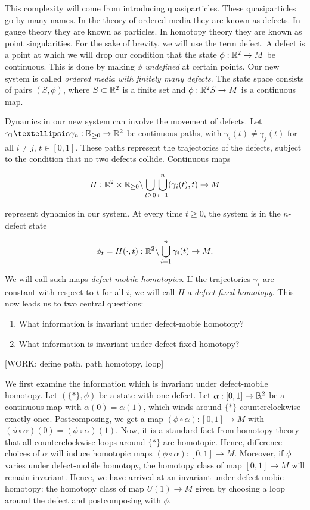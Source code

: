 \documentclass{article}
\theoremstyle{definition}
\numberwithin{figure}{section}
\begin{document}
This complexity will come from introducing quasiparticles. These quasiparticles go by many names. In the theory of ordered media they are known as defects. In gauge theory they are known as particles. In homotopy theory they are known as point singularities. For the sake of brevity, we will use the term defect. A defect is a point at which we will drop our condition that the state $\phi:\mathbb{R}^2\to M$ be continuous. This is done by making $\phi$ \textit{undefined} at certain points. Our new system is called \textit{ordered media with finitely many defects}. The state space consists of pairs $(S,\phi)$, where $S\subset \mathbb{R}^2$ is a finite set and $\phi: \mathbb{R}^2\\ S\to M$ is a continuous map.

Dynamics in our new system can involve the movement of defects. Let $\gamma_1… \gamma_n: \RR_{\geq 0} \to \RR^2$ be continuous paths, with $ \gamma_i(t)\neq \gamma_j(t)$ for all $i\neq j$, $t\in [0,1]$. These paths represent the trajectories of the defects, subject to the condition that no two defects collide. Continuous maps

$$H:\mathbb{R}^2\times \mathbb{R}_{\geq 0} \backslash \bigcup_{t\geq 0}\bigcup_{i=1}^{n}(\gamma_i(t),t)\to M$$

represent dynamics in our system. At every time $t\geq 0$, the system is in the $n$-defect state

$$\phi_t=H(\cdot,t): \mathbb{R}^2\backslash \bigcup_{i=1}^{n}\gamma_i(t)\to M.$$

We will call such maps \textit{defect-mobile homotopies}. If the trajectories $\gamma_i$ are constant with respect to $t$ for all $i$, we will call $H$ a \textit{defect-fixed homotopy}. This now leads us to two central questions:

\begin{enumerate}
\item What information is invariant under defect-mobie homotopy?
\item What information is invariant under defect-fixed homotopy?
\end{enumerate}


[WORK: define path, path homotopy, loop]

We first examine the information which is invariant under defect-mobile homotopy. Let $(\{*\},\phi)$ be a state with one defect. Let $\alpha:[0,1]\to \mathbb{R}^2$ be a continuous map with $\alpha(0)=\alpha(1)$, which winds around $\{*\}$ counterclockwise exactly once. Postcomposing, we get a map $(\phi\circ \alpha): [0,1]\to M$ with $(\phi\circ\alpha)(0)=(\phi\circ\alpha)(1)$. Now, it is a standard fact from homotopy theory that all counterclockwise loops around $\{*\}$ are homotopic. Hence, difference choices of $\alpha$ will induce homotopic maps $(\phi\circ\alpha):[0,1]\to M$. Moreover, if $\phi$ varies under defect-mobile homotopy, the homotopy class of map $[0,1]\to M$ will remain invariant. Hence, we have arrived at an invariant under defect-mobie homotopy: the homotopy class of map $U(1) \to M$ given by choosing a loop around the defect and postcomposing with $\phi$.
\end{document}
